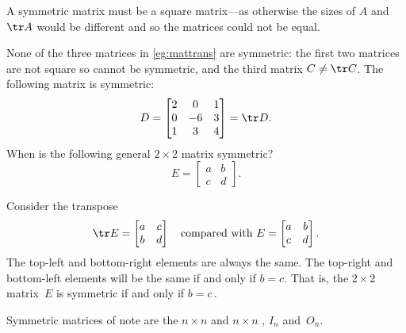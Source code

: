 A symmetric matrix must be a square matrix---as otherwise the sizes of \(A\) and~\(\tr A\) would be different and so the matrices could not be equal.


\begin{example} \label{eg:}
None of the three matrices in \autoref{eg:mattrans} are symmetric: the first two matrices are not square so cannot be symmetric, and the third matrix \(C\neq\tr C\).  
The following matrix is symmetric:
\begin{equation*}
D=\begin{bmatrix} 2 & 0 & 1\\ 0 & -6 & 3\\ 1 & 3 & 4  \end{bmatrix}
=\tr D.
\end{equation*}
When is the following general \(2\times2\) matrix symmetric?
\begin{equation*}
E=\begin{bmatrix} a&b\\c&d \end{bmatrix}.
\end{equation*}
\begin{solution} 
Consider the transpose
\begin{equation*}
\tr E=\begin{bmatrix} a&c\\b&d \end{bmatrix}
\quad\text{compared with }
E=\begin{bmatrix} a&b\\c&d \end{bmatrix}.
\end{equation*}
The top-left and bottom-right elements are always the same.
The top-right and bottom-left elements will be the same if and only if \(b=c\).
That is, the \(2\times 2\) matrix~\(E\) is symmetric if and only if \(b=c\)\,.
\end{solution}
\end{example}

Symmetric matrices of note are the \(n\times n\)  and \(n\times n\) , \(I_n\) and~\(O_n\).


